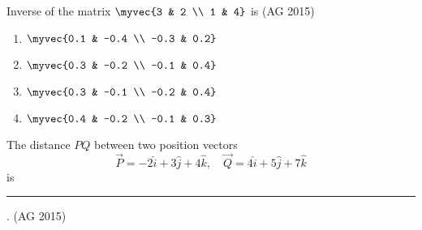 \item Inverse of the matrix 
$
\myvec{3 & 2 \\ 1 & 4}
$
is
\hfill{(AG 2015)}
\begin{multicols}{4}
\begin{enumerate}
    \item  $\myvec{0.1 & -0.4 \\ -0.3 & 0.2}$
    \item  $\myvec{0.3 & -0.2 \\ -0.1 & 0.4}$
    \item  $\myvec{0.3 & -0.1 \\ -0.2 & 0.4}$
    \item  $\myvec{0.4 & -0.2 \\ -0.1 & 0.3}$
\end{enumerate}
\end{multicols}

\item The distance $PQ$ between two position vectors 
\[
\vec{P} = -2\hat{i} + 3\hat{j} + 4\hat{k}, 
\quad \vec{Q} = 4\hat{i} + 5\hat{j} + 7\hat{k}
\]
is \rule{1cm}{0.01pt}.
\hfill{(AG 2015)}

